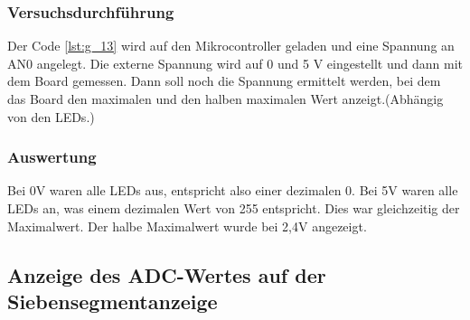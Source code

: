 \documentclass[12pt,a4paper]{article}
\begin{document}
\subsubsection*{Versuchsdurchführung}

Der Code \ref{lst:g_13} wird auf den Mikrocontroller geladen und eine Spannung an AN0 angelegt. Die externe Spannung wird auf 0 und 5 V eingestellt und dann mit dem Board gemessen. Dann soll noch die Spannung ermittelt werden, bei dem das  Board den maximalen und den halben maximalen Wert anzeigt.(Abhängig von den LEDs.)


\subsubsection*{Auswertung}

Bei 0V waren alle LEDs aus, entspricht also einer dezimalen 0. Bei 5V waren alle LEDs an, was einem dezimalen Wert von 255 entspricht. Dies war gleichzeitig der Maximalwert. Der halbe Maximalwert wurde bei 2,4V angezeigt.

\subsection{Anzeige des ADC-Wertes auf der Siebensegmentanzeige}
\end{document}
